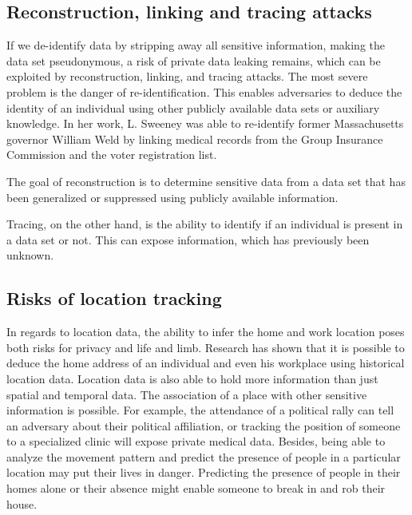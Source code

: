 \subsection{Reconstruction, linking and tracing attacks}
If we de-identify data by stripping away all sensitive information, making the data set pseudonymous, a risk of private data leaking remains, which can be exploited by reconstruction, linking, and tracing attacks. The most severe problem is the danger of re-identification.
This enables adversaries to deduce the identity of an individual using other publicly available data sets or auxiliary knowledge. 
In her work, L. Sweeney was able to re-identify former Massachusetts governor William Weld by linking medical records from the Group Insurance Commission and the voter registration list.

 The goal of reconstruction is to determine sensitive data from a data set that has been generalized or suppressed using publicly available information. 
 
Tracing, on the other hand, is the ability to identify if an individual is present in a data set or not. This can expose information, which has previously been unknown.

\subsection{Risks of location tracking}
In regards to location data, the ability to infer the home and work location poses both risks for privacy and life and limb. Research has shown that it is possible to deduce the home address of an individual and even his workplace using historical location data.
Location data is also able to hold more information than just spatial and temporal data. The association of a place with other sensitive information is possible. For example, the attendance of a political rally can tell an adversary about their political affiliation, or tracking the position of someone to a specialized clinic will expose private medical data.
Besides, being able to analyze the movement pattern and predict the presence of people in a particular location may put their lives in danger. Predicting the presence of people in their homes alone or their absence might enable someone to break in and rob their house.


